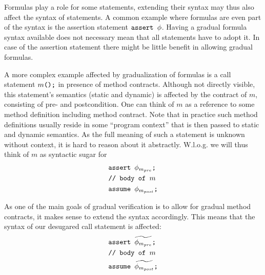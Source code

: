 Formulas play a role for some statements, extending their syntax may thus also affect the syntax of statements.
A common example where formulas are even part of the syntax is the assertion statement $\texttt{assert $\phi$}$.
Having a gradual formula syntax available does not necessary mean that all statements have to adopt it.
In case of the assertion statement there might be little benefit in allowing gradual formulas.

A more complex example affected by gradualization of formulas is a call statement $\texttt{$m$();}$ in presence of method contracts.
Although not directly visible, this statement's semantics (static and dynamic) is affected by the contract of $m$, consisting of pre- and postcondition.
One can think of $m$ as a reference to some method definition including method contract.
Note that in practice such method definitions usually reside in some “program context” that is then passed to static and dynamic semantics.
As the full meaning of such a statement is unknown without context, it is hard to reason about it abstractly.
W.l.o.g. we will thus think of $m$ as syntactic sugar for 
\begin{align*}
&\texttt{assert $\phi_{m_{pre}}$;}\\
&\texttt{// body of $m$}\\
&\texttt{assume $\phi_{m_{post}}$;}
\end{align*}

As one of the main goals of gradual verification is to allow for gradual method contracts, it makes sense to extend the syntax accordingly.
This means that the syntax of our desugared call statement is affected:
\begin{align*}
&\texttt{assert $\widetilde{\phi_{m_{pre}}}$;}\\
&\texttt{// body of $m$}\\
&\texttt{assume $\widetilde{\phi_{m_{post}}}$;}
\end{align*}


